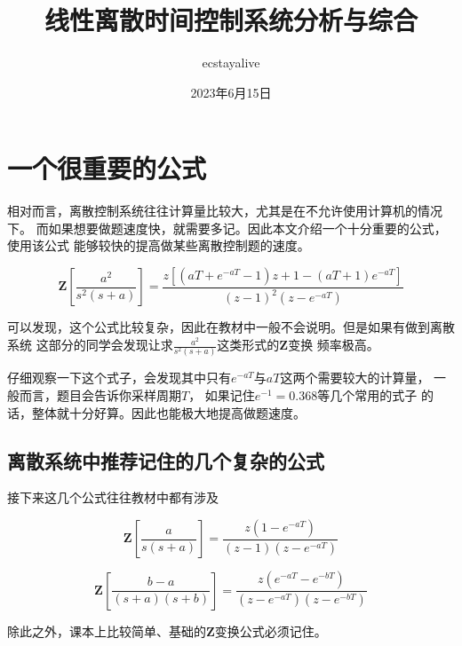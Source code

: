 \documentclass{ctexart}
\begin{document}
\title{线性离散时间控制系统分析与综合}
\author{ecstayalive}
\date{2023年6月15日}
\maketitle

\section{一个很重要的公式}
相对而言，离散控制系统往往计算量比较大，尤其是在不允许使用计算机的情况下。
而如果想要做题速度快，就需要多记。因此本文介绍一个十分重要的公式，使用该公式
能够较快的提高做某些离散控制题的速度。

\begin{equation}
    \mathbf{Z}[\frac{a^2}{s^2(s+a)}] = \frac{z[(aT+e^{-aT}-1)z +
    1-(aT+1)e^{-aT}]}{(z-1)^2(z-e^{-aT})}
\end{equation}

可以发现，这个公式比较复杂，因此在教材中一般不会说明。但是如果有做到离散系统
这部分的同学会发现让求$\frac{a^2}{s^2(s+a)}$这类形式的$\mathbf{Z}$变换
频率极高。

仔细观察一下这个式子，会发现其中只有$e^{-aT}$与$aT$这两个需要较大的计算量，
一般而言，题目会告诉你采样周期$T$， 如果记住$e^{-1} = 0.368$等几个常用的式子
的话，整体就十分好算。因此也能极大地提高做题速度。

\subsection{离散系统中推荐记住的几个复杂的公式}
接下来这几个公式往往教材中都有涉及

\begin{equation}
    \mathbf{Z}[\frac{a}{s(s+a)}] =
    \frac{z(1 - e^{-aT})}{(z-1)(z-e^{-aT})}
\end{equation}

\begin{equation}
    \mathbf{Z}[\frac{b-a}{(s+a)(s+b)}] =
    \frac{z(e^{-aT}-e^{-bT})}{(z-e^{-aT})(z-e^{-bT})}
\end{equation}

除此之外，课本上比较简单、基础的$\mathbf{Z}$变换公式必须记住。
\end{document}
